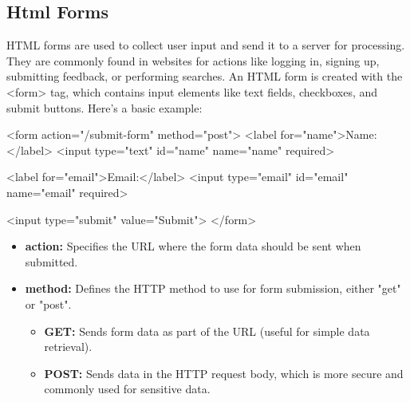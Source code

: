 \documentclass{report}
\begin{document}
\pagebreak 
{}
\bigbreak \noindent 
\bigbreak \noindent 
\subsection{Html Forms}
\bigbreak \noindent 
HTML forms are used to collect user input and send it to a server for processing. They are commonly found in websites for actions like logging in, signing up, submitting feedback, or performing searches.
\bigbreak \noindent 
An HTML form is created with the <form> tag, which contains input elements like text fields, checkboxes, and submit buttons. Here’s a basic example:
\bigbreak \noindent 
\begin{htmlcode}
<form action="/submit-form" method="post">
  <label for="name">Name:</label>
  <input type="text" id="name" name="name" required>

  <label for="email">Email:</label>
  <input type="email" id="email" name="email" required>

  <input type="submit" value="Submit">
</form>
\end{htmlcode}
\bigbreak \noindent 
\begin{itemize}
    \item \textbf{action:} Specifies the URL where the form data should be sent when submitted.
    \item \textbf{method:} Defines the HTTP method to use for form submission, either "get" or "post".
        \begin{itemize}
            \item \textbf{GET:} Sends form data as part of the URL (useful for simple data retrieval).
            \item \textbf{POST:} Sends data in the HTTP request body, which is more secure and commonly used for sensitive data.
        \end{itemize}
\end{itemize}
\end{document}
